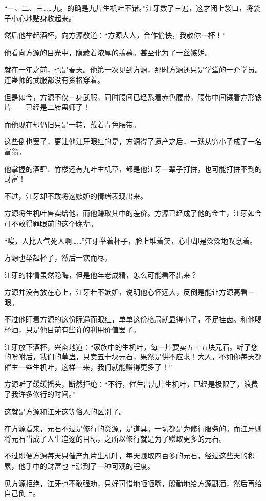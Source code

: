 \begin{this_body}
“一、二、三……九。的确是九片生机叶不错。”江牙数了三遍，这才闭上袋口，将袋子小心地贴身收起来。

然后他举起酒杯，向方源敬道：“方源大人，合作愉快，我敬你一杯！”

他看向方源的目光中，隐藏着浓厚的羡慕。甚至化为了一丝嫉妒。

就在一年之前，也是春天。他第一次见到方源，那时方源还只是学堂的一介学员。连蛊师的武服都没有资格穿着。

但是如今，方源不仅一身武服，同时腰间已经系着赤色腰带，腰带中间镶着方形铁片——已经是二转蛊师了！

而他现在却仍旧只是一转，戴着青色腰带。

这些倒也罢了，更让他江牙眼红的是，方源得了遗产之后，一跃从穷小子成了一名富翁。

他掌握的酒肆、竹楼还有九叶生机草，都是他江牙一辈子打拼，也可能打拼不到的财富！

不过，江牙却不敢将这嫉妒的情绪表现出来。

方源将生机叶售卖给他，而他赚取其中的差价。方源已经成了他的金主，江牙如今可不敢得罪眼前的这个晚辈。

“唉，人比人气死人啊……”江牙举着杯子，脸上堆着笑，心中却是深深地叹息着。

方源也举起杯子，然后一饮而尽。

江牙的神情虽然隐晦，但是他年老成精，怎么可能看不出来？

方源并没有放在心上，江牙若不嫉妒，说明他心怀远大，反倒是能让方源高看一眼。

不过他盯着方源的这份际遇而眼红，单单这份格局就显得小了，不足挂齿。和他喝杯酒，只是他目前有些许的利用价值罢了。

江牙放下酒杯，兴奋地道：“家族中的生机叶，每一片要卖五十五块元石。听了您的吩咐后，我们的草蛊，只卖五十块元石，果然是供不应求！大人，不如你每天都催生一些生机叶，这样一来，我们就能赚得更多了！”

方源听了缓缓摇头，断然拒绝：“不行，催生出九片生机叶，已经是极限了，浪费了我许多修行的时间。”

这就是方源和江牙这等俗人的区别了。

在方源看来，元石不过是修行的资源，是道具。一切都是为修行服务的。而江牙则将元石当成了人生追逐的目标，之所以修行就是为了赚取更多的元石。

不过即便方源每天只催产九片生机叶，每天赚取四百多的元石，经过这些天的积累，他手中的财富也上涨到了一种可观的程度。

见方源拒绝，江牙也不敢强劝，只好可惜地咂咂嘴，殷勤地给方源斟酒，然后再给自己倒上。


\end{this_body}
